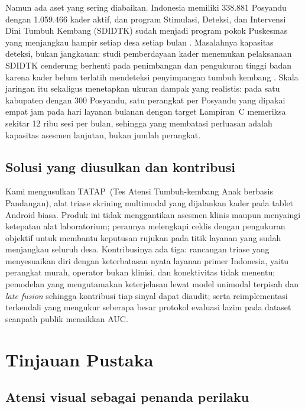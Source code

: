 \documentclass[10pt,letterpaper]{article}
\newcommand{\produk}{TATAP}
\begin{document}
Namun ada aset yang sering diabaikan. Indonesia memiliki 338.881 Posyandu dengan 1.059.466
kader aktif, dan program Stimulasi, Deteksi, dan Intervensi Dini Tumbuh Kembang (SDIDTK) sudah
menjadi program pokok Puskesmas yang menjangkau hampir setiap desa setiap bulan
\cite{kemenkopmk2023}. Masalahnya kapasitas deteksi, bukan jangkauan: studi pemberdayaan kader
menemukan pelaksanaan SDIDTK cenderung berhenti pada penimbangan dan pengukuran tinggi badan
karena kader belum terlatih mendeteksi penyimpangan tumbuh kembang \cite{mardhika2022}. Skala
jaringan itu sekaligus menetapkan ukuran dampak yang realistis: pada satu kabupaten dengan 300
Posyandu, satu perangkat per Posyandu yang dipakai empat jam pada hari layanan bulanan dengan
target Lampiran~C memeriksa sekitar 12 ribu sesi per bulan, sehingga yang membatasi perluasan
adalah kapasitas asesmen lanjutan, bukan jumlah perangkat.

\subsection{Solusi yang diusulkan dan kontribusi}

Kami mengusulkan \produk\ (Tes Atensi Tumbuh-kembang Anak berbasis Pandangan), alat triase
skrining multimodal yang dijalankan kader pada tablet Android biasa. Produk ini tidak
menggantikan asesmen klinis maupun menyaingi ketepatan alat laboratorium; perannya melengkapi
ceklis dengan pengukuran objektif untuk membantu keputusan rujukan pada titik layanan yang
sudah menjangkau seluruh desa. Kontribusinya ada tiga: rancangan triase yang menyesuaikan diri
dengan keterbatasan nyata layanan primer Indonesia, yaitu perangkat murah, operator bukan
klinisi, dan konektivitas tidak menentu; pemodelan yang mengutamakan keterjelasan lewat model
unimodal terpisah dan \textit{late fusion} sehingga kontribusi tiap sinyal dapat diaudit;
serta reimplementasi terkendali yang mengukur seberapa besar protokol evaluasi lazim pada
dataset scanpath publik menaikkan AUC.

\section{Tinjauan Pustaka}

\subsection{Atensi visual sebagai penanda perilaku}
\end{document}
